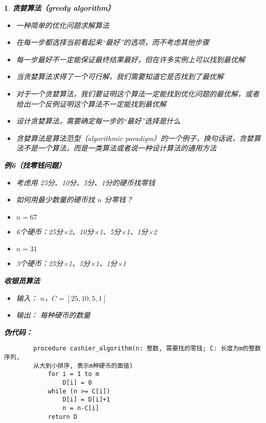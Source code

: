 \documentclass[UTF8]{report}
\theoremstyle{MyLineTheoremStyle} %
\theoremstyle{MyBlockTheoremStyle} %
\theoremstyle{MySubsubsectionStyle} %
\newtheorem{definition}{}
\begin{document}
\begin{definition}
    \textbf{贪婪算法（greedy algorithm）}\par
    \begin{itemize}
        \item 一种简单的优化问题求解算法
        \item 在每一步都选择当前看起来“最好”的选项，而不考虑其他步骤
        \item 每一步最好不一定能保证最终结果最好，但在许多实例上可以找到最优解
        \item 当贪婪算法求得了一个可行解，我们需要知道它是否找到了最优解
        \item 对于一个贪婪算法，我们要证明这个算法一定能找到优化问题的最优解，或者给出一个反例证明这个算法不一定能找到最优解
        \item 设计贪婪算法，需要确定每一步的“最好”选择是什么
        \item 贪婪算法是算法范型（algorithmic paradigm）的一个例子，换句话说，贪婪算法不是一个算法，而是一类算法或者说一种设计算法的通用方法
    \end{itemize}

    \textbf{例6（找零钱问题）}\par
    \begin{itemize}
        \item 考虑用 25分、10分、5分、1分的硬币找零钱
        \item 如何用最少数量的硬币找 $n$ 分零钱？
        \item $n = 67$
        \item 6个硬币：25分×2、10分×1、5分×1、1分×2
        \item $n = 31$
        \item 3个硬币：25分×1、5分×1、1分×1
    \end{itemize}

    \textbf{收银员算法}\par
    \begin{itemize}
        \item 输入： $n$，$C = [25, 10, 5, 1]$
        \item 输出： 每种硬币的数量
    \end{itemize}

    \textbf{伪代码：}\par
    \begin{verbatim}
        procedure cashier_algorithm(n: 整数, 需要找的零钱; C: 长度为m的整数序列, 
        从大到小排序, 表示m种硬币的面值)
            for i = 1 to m
                D[i] = 0
            while (n >= C[i])
                D[i] = D[i]+1
                n = n-C[i]
            return D
    \end{verbatim}


\end{definition}
\end{document}
